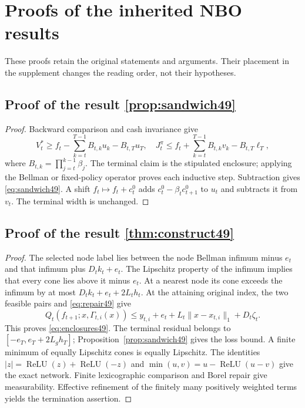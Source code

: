\section{Proofs of the inherited NBO results}\label{supp:proofs67}
These proofs retain the original statements and arguments. Their placement in the supplement changes the reading order, not their hypotheses.

\subsection{Proof of the result \ref{prop:sandwich49}}\label{supp:proof-core49-1}
\begin{proof}
Backward comparison and cash invariance give
\[
 V_t^*\ge f_t-\sum_{k=t}^{T-1}B_{t,k}u_k-B_{t,T}u_T,
 \quad
 J_t^\pi\le f_t+\sum_{k=t}^{T-1}B_{t,k}v_k-B_{t,T}\ell_T,
\]
where $B_{t,k}=\prod_{j=t}^{k-1}\beta_j$. The terminal claim is the stipulated enclosure; applying the Bellman or fixed-policy operator proves each inductive step. Subtraction gives \eqref{eq:sandwich49}. A shift $f_t\mapsto f_t+c_t^0$ adds $c_t^0-\beta_tc_{t+1}^0$ to $u_t$ and subtracts it from $v_t$. The terminal width is unchanged.
\end{proof}

\subsection{Proof of the result \ref{thm:construct49}}\label{supp:proof-core49-2}
\begin{proof}
The selected node label lies between the node Bellman infimum minus $e_t$ and that infimum plus $D_tk_t+e_t$. The Lipschitz property of the infimum implies that every cone lies above it minus $e_t$. At a nearest node its cone exceeds the infimum by at most $D_tk_t+e_t+2L_th_t$. At the attaining original index, the two feasible pairs and \eqref{eq:repair49} give
\[
 Q_t(f_{t+1};x,\Gamma_{t,i}(x))
 \le y_{t,i}+e_t+L_t\|x-x_{t,i}\|_1+D_t\zeta_t.
\]
This proves \eqref{eq:enclosures49}. The terminal residual belongs to $[-e_T,e_T+2L_gh_T]$; Proposition~\ref{prop:sandwich49} gives the loss bound. A finite minimum of equally Lipschitz cones is equally Lipschitz. The identities $|z|=\operatorname{ReLU}(z)+\operatorname{ReLU}(-z)$ and $\min(u,v)=u-\operatorname{ReLU}(u-v)$ give the exact network. Finite lexicographic comparison and Borel repair give measurability. Effective refinement of the finitely many positively weighted terms yields the termination assertion.
\end{proof}

